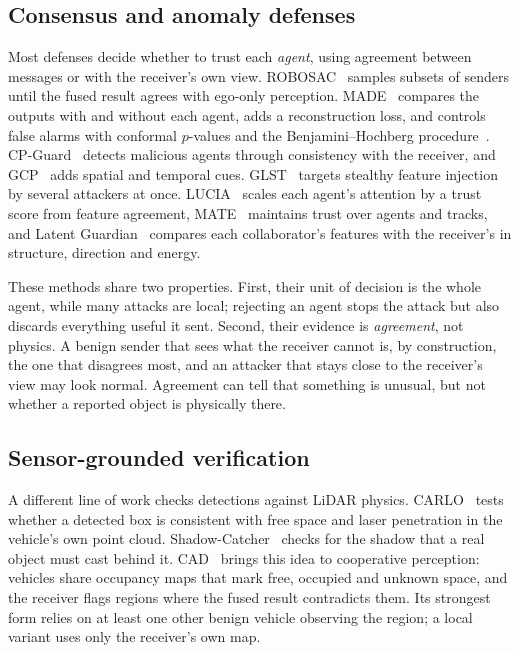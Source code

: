 \documentclass[conference]{IEEEtran}
\begin{document}
\subsection{Consensus and anomaly defenses}
Most defenses decide whether to trust each \emph{agent}, using agreement between messages or with the receiver's
own view. ROBOSAC~\cite{li2023robosac} samples subsets of senders until the fused result agrees with ego-only
perception. MADE~\cite{zhao2024made} compares the outputs with and without each agent, adds a reconstruction
loss, and controls false alarms with conformal $p$-values and the Benjamini--Hochberg
procedure~\cite{benjamini1995fdr}. CP-Guard~\cite{hu2025cpguard} detects malicious agents through consistency
with the receiver, and GCP~\cite{tao2026gcp} adds spatial and temporal cues. GLST~\cite{he2026glst} targets
stealthy feature injection by several attackers at once. LUCIA~\cite{wang2025lucia} scales each agent's attention
by a trust score from feature agreement, MATE~\cite{hallyburton2025mate} maintains trust over agents and
tracks, and Latent Guardian~\cite{zhang2026latentguardian} compares each collaborator's features with the
receiver's in structure, direction and energy.

These methods share two properties. First, their unit of decision is the whole agent, while many attacks are
local; rejecting an agent stops the attack but also discards everything useful it sent. Second, their evidence is
\emph{agreement}, not physics. A benign sender that sees what the receiver cannot is, by construction, the one that
disagrees most, and an attacker that stays close to the receiver's view may look normal. Agreement can tell that
something is unusual, but not whether a reported object is physically there.

\subsection{Sensor-grounded verification}
A different line of work checks detections against LiDAR physics. CARLO~\cite{sun2020carlo} tests whether a
detected box is consistent with free space and laser penetration in the vehicle's own point cloud.
Shadow-Catcher~\cite{hau2021shadowcatcher} checks for the shadow that a real object must cast behind it. CAD~\cite{zhang2024cad}
brings this idea to cooperative perception: vehicles share occupancy maps that mark free, occupied and unknown
space, and the receiver flags regions where the fused result contradicts them. Its strongest form relies on at
least one other benign vehicle observing the region; a local variant uses only the receiver's own map.
\end{document}

